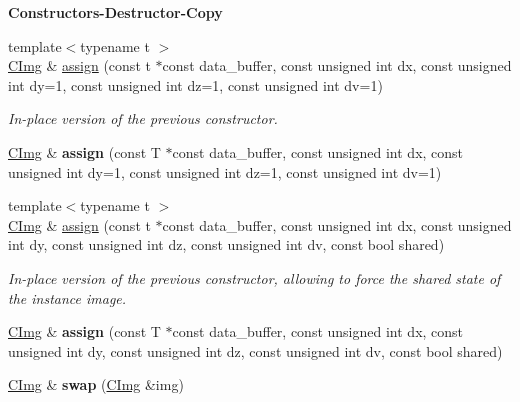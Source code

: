 \begin{Indent}{\bf Constructors-\/Destructor-\/Copy}
\begin{DoxyCompactItemize}
\item 
\hypertarget{structcimg__library_1_1_c_img_aff160dedc67b60cc808ae345b81e83d3}{
{\footnotesize template$<$typename t $>$ }\\\hyperlink{structcimg__library_1_1_c_img}{CImg} \& \hyperlink{structcimg__library_1_1_c_img_aff160dedc67b60cc808ae345b81e83d3}{assign} (const t $\ast$const data\_\-buffer, const unsigned int dx, const unsigned int dy=1, const unsigned int dz=1, const unsigned int dv=1)}
\label{structcimg__library_1_1_c_img_aff160dedc67b60cc808ae345b81e83d3}

\begin{DoxyCompactList}\small\item\em In-\/place version of the previous constructor. \item\end{DoxyCompactList}\item 
\hypertarget{structcimg__library_1_1_c_img_a7a57402bd4c7d8e4f369d911e6298f97}{
\hyperlink{structcimg__library_1_1_c_img}{CImg} \& {\bfseries assign} (const T $\ast$const data\_\-buffer, const unsigned int dx, const unsigned int dy=1, const unsigned int dz=1, const unsigned int dv=1)}
\label{structcimg__library_1_1_c_img_a7a57402bd4c7d8e4f369d911e6298f97}

\item 
\hypertarget{structcimg__library_1_1_c_img_ad2703bb73626084dec0300bf5d58e250}{
{\footnotesize template$<$typename t $>$ }\\\hyperlink{structcimg__library_1_1_c_img}{CImg} \& \hyperlink{structcimg__library_1_1_c_img_ad2703bb73626084dec0300bf5d58e250}{assign} (const t $\ast$const data\_\-buffer, const unsigned int dx, const unsigned int dy, const unsigned int dz, const unsigned int dv, const bool shared)}
\label{structcimg__library_1_1_c_img_ad2703bb73626084dec0300bf5d58e250}

\begin{DoxyCompactList}\small\item\em In-\/place version of the previous constructor, allowing to force the shared state of the instance image. \item\end{DoxyCompactList}\item 
\hypertarget{structcimg__library_1_1_c_img_a61d062909d722312dd86c40cea4750cc}{
\hyperlink{structcimg__library_1_1_c_img}{CImg} \& {\bfseries assign} (const T $\ast$const data\_\-buffer, const unsigned int dx, const unsigned int dy, const unsigned int dz, const unsigned int dv, const bool shared)}
\label{structcimg__library_1_1_c_img_a61d062909d722312dd86c40cea4750cc}

\item 
\hypertarget{structcimg__library_1_1_c_img_aba06f9da71067abe486157c00176d860}{
\hyperlink{structcimg__library_1_1_c_img}{CImg} \& {\bfseries swap} (\hyperlink{structcimg__library_1_1_c_img}{CImg} \&img)}
\label{structcimg__library_1_1_c_img_aba06f9da71067abe486157c00176d860}

\end{DoxyCompactItemize}
\end{Indent}
